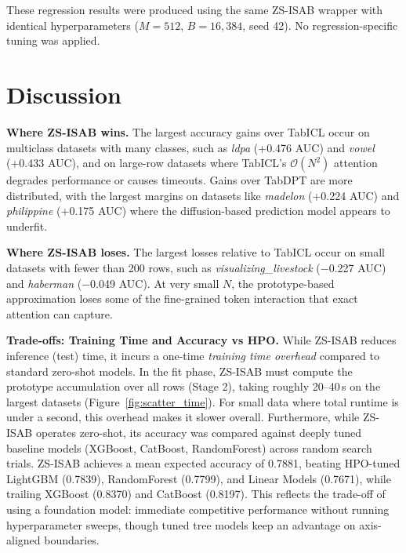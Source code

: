 \documentclass[10pt]{article}
\begin{document}
These regression results were produced using the same ZS-ISAB wrapper with identical hyperparameters ($M=512$, $B=16{,}384$, seed 42). No regression-specific tuning was applied.

\section{Discussion}

\textbf{Where ZS-ISAB wins.}
The largest accuracy gains over TabICL occur on multiclass datasets with many classes, such as \textit{ldpa} (+0.476 AUC) and \textit{vowel} (+0.433 AUC), and on large-row datasets where TabICL's $\mathcal{O}(N^2)$ attention degrades performance or causes timeouts. Gains over TabDPT are more distributed, with the largest margins on datasets like \textit{madelon} (+0.224 AUC) and \textit{philippine} (+0.175 AUC) where the diffusion-based prediction model appears to underfit.

\textbf{Where ZS-ISAB loses.}
The largest losses relative to TabICL occur on small datasets with fewer than 200 rows, such as \textit{visualizing\_livestock} ($-$0.227 AUC) and \textit{haberman} ($-$0.049 AUC). At very small $N$, the prototype-based approximation loses some of the fine-grained token interaction that exact attention can capture.

\textbf{Trade-offs: Training Time and Accuracy vs HPO.}
While ZS-ISAB reduces inference (test) time, it incurs a one-time \emph{training time overhead} compared to standard zero-shot models. In the fit phase, ZS-ISAB must compute the prototype accumulation over all rows (Stage 2), taking roughly 20--40\,s on the largest datasets (Figure~\ref{fig:scatter_time}). For small data where total runtime is under a second, this overhead makes it slower overall. 
Furthermore, while ZS-ISAB operates zero-shot, its accuracy was compared against deeply tuned baseline models (XGBoost, CatBoost, RandomForest) across random search trials. ZS-ISAB achieves a mean expected accuracy of 0.7881, beating HPO-tuned LightGBM (0.7839), RandomForest (0.7799), and Linear Models (0.7671), while trailing XGBoost (0.8370) and CatBoost (0.8197). This reflects the trade-off of using a foundation model: immediate competitive performance without running hyperparameter sweeps, though tuned tree models keep an advantage on axis-aligned boundaries.
\end{document}
